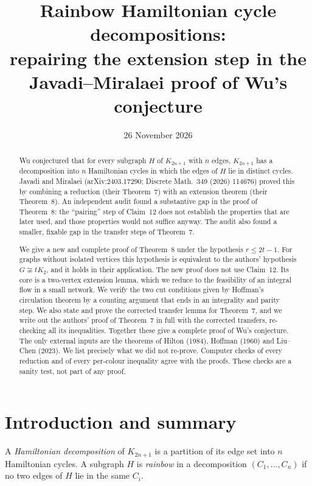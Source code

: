\documentclass[11pt]{amsart}
\title[Repairing the extension step of Javadi--Miralaei]{Rainbow Hamiltonian cycle
decompositions:\\ repairing the extension step in the\\ Javadi--Miralaei proof of Wu's
conjecture}
\date{26 November 2026}
\theoremstyle{definition}
\theoremstyle{remark}
\begin{document}
\begin{abstract}
Wu conjectured that for every subgraph $H$ of $K_{2n+1}$ with $n$ edges, $K_{2n+1}$ has a
decomposition into $n$ Hamiltonian cycles in which the edges of $H$ lie in distinct cycles.
Javadi and Miralaei (arXiv:2403.17290; Discrete Math.\ 349 (2026) 114676) proved this by
combining a reduction (their Theorem~7) with an extension theorem (their Theorem~8). An
independent audit found a substantive gap in the proof of Theorem~8: the ``pairing'' step of
Claim~12 does not establish the properties that are later used, and those properties would not
suffice anyway. The audit also found a smaller, fixable gap in the transfer steps of
Theorem~7.

We give a new and complete proof of Theorem~8 under the hypothesis $r\le 2t-1$. For graphs
without isolated vertices this hypothesis is equivalent to the authors' hypothesis
$G\not\cong tK_2$, and it holds in their application. The new proof does not use Claim~12.
Its core is a two-vertex extension lemma, which we reduce to the feasibility of an integral flow
in a small network. We verify the two cut conditions given by Hoffman's circulation theorem by a
counting argument that ends in an integrality and parity step. We also state and prove the
corrected transfer lemma for Theorem~7, and we write out the authors' proof of Theorem~7 in
full with the corrected transfers, re-checking all its inequalities. Together these give a
complete proof of Wu's conjecture. The only external inputs are the theorems of Hilton (1984),
Hoffman (1960) and Liu--Chen (2023). We list precisely what we did not re-prove. Computer
checks of every reduction and of every per-colour inequality agree with the proofs. These checks
are a sanity test, not part of any proof.
\end{abstract}

\maketitle

\section{Introduction and summary}\label{sec:intro}

A \emph{Hamiltonian decomposition} of $K_{2n+1}$ is a partition of its edge set into $n$
Hamiltonian cycles. A subgraph $H$ is \emph{rainbow} in a decomposition $(C_1,\dots,C_n)$ if no
two edges of $H$ lie in the same $C_i$.
\end{document}
